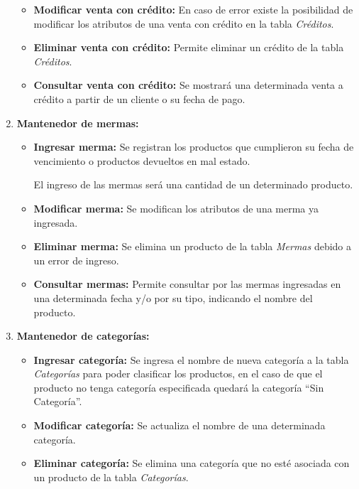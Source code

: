 \documentclass[letterpaper,12pt]{article}
\begin{document}
\begin{enumerate}
\begin{itemize}
\item \textbf{Modificar venta con crédito: }
En caso de error existe la posibilidad de modificar los atributos de una venta con crédito en la tabla \emph{Créditos}. 


\item \textbf{Eliminar venta con crédito: }
Permite eliminar un crédito de la tabla \emph{Créditos}.

\item \textbf{Consultar venta con crédito: }
Se mostrará una determinada venta a crédito a partir de un cliente o su fecha de 
pago.
\end{itemize}

\newpage

\item \textbf{Mantenedor de mermas:} 

\begin{itemize}
\item \textbf{Ingresar merma:}
Se registran los productos que cumplieron su fecha de vencimiento o productos devueltos en mal estado. 

El ingreso de las mermas será una cantidad de un determinado producto.

\item \textbf{Modificar merma:}
Se modifican los atributos de una merma ya ingresada.

\item \textbf{Eliminar merma:}
Se elimina un producto de la tabla \emph{Mermas} debido a un error de ingreso.

\item \textbf{Consultar mermas:}
Permite consultar por las mermas ingresadas en una determinada fecha y/o por su tipo, indicando el nombre del producto.
\end{itemize}

\item \textbf{Mantenedor de categorías:} 

\begin{itemize}
\item \textbf{Ingresar categoría:} 
Se ingresa el nombre de nueva categoría a la tabla \emph{Categorías} para poder clasificar los productos, en el caso de que el producto no tenga categoría especificada quedará la categoría ``Sin Categoría''.

\item \textbf{Modificar categoría:}
Se actualiza el nombre de una determinada categoría.

\item \textbf{Eliminar categoría:}
Se elimina una categoría que no esté asociada con un producto de la tabla \emph{Categorías}.


\end{itemize}
\end{enumerate}
\end{document}
